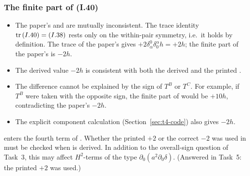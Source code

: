 \subsubsection{The finite part of (I.40)}
\begin{itemize}
\item The paper's  and  are mutually inconsistent. The trace identity
\(\mathrm{tr}\,(I.40)=(I.38)\) rests only on the within-pair symmetry, i.e.\ it holds by
definition. The trace of the paper's  gives \(+2\delta^0_\alpha\delta^\alpha_0h=+2h\);
the finite part of the paper's  is \(-2h\).
\item The derived value \(-2h\) is consistent with both the derived and the printed .
\item The difference cannot be explained by the sign of \(T^B\) or \(T^C\). For example, if
\(T^B\) were taken with the opposite sign, the finite part of  would be \(+10h\),
contradicting the paper's \(-2h\).
\item The explicit component calculation (Section~\ref{sec:t4-code}) also gives \(-2h\).
\end{itemize}
\begin{notebox}
 enters the fourth term of . Whether the printed \(+2\) or the correct
\(-2\) was used in  must be checked when  is derived. In addition to the
overall-sign question of Task~3, this may affect \(H^2\)-terms of the type
\(\partial_0(a^2\partial_0\delta)\). (Answered in Task~5: the printed \(+2\) was used.)
\end{notebox}

